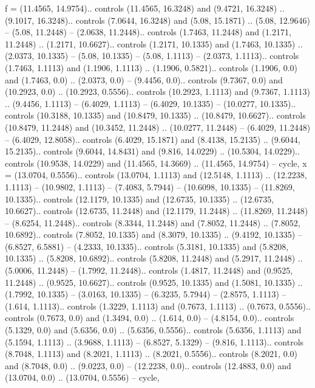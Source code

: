 {f} = {(11.4565, 14.9754).. controls (11.4565, 16.3248) and (9.4721, 16.3248) .. (9.1017, 16.3248).. controls (7.0644, 16.3248) and (5.08, 15.1871) .. (5.08, 12.9646) -- (5.08, 11.2448) -- (2.0638, 11.2448).. controls (1.7463, 11.2448) and (1.2171, 11.2448) .. (1.2171, 10.6627).. controls (1.2171, 10.1335) and (1.7463, 10.1335) .. (2.0373, 10.1335) -- (5.08, 10.1335) -- (5.08, 1.1113) -- (2.0373, 1.1113).. controls (1.7463, 1.1113) and (1.1906, 1.1113) .. (1.1906, 0.5821).. controls (1.1906, 0.0) and (1.7463, 0.0) .. (2.0373, 0.0) -- (9.4456, 0.0).. controls (9.7367, 0.0) and (10.2923, 0.0) .. (10.2923, 0.5556).. controls (10.2923, 1.1113) and (9.7367, 1.1113) .. (9.4456, 1.1113) -- (6.4029, 1.1113) -- (6.4029, 10.1335) -- (10.0277, 10.1335).. controls (10.3188, 10.1335) and (10.8479, 10.1335) .. (10.8479, 10.6627).. controls (10.8479, 11.2448) and (10.3452, 11.2448) .. (10.0277, 11.2448) -- (6.4029, 11.2448) -- (6.4029, 12.8058).. controls (6.4029, 15.1871) and (8.4138, 15.2135) .. (9.6044, 15.2135).. controls (9.6044, 14.8431) and (9.816, 14.0229) .. (10.5304, 14.0229).. controls (10.9538, 14.0229) and (11.4565, 14.3669) .. (11.4565, 14.9754) -- cycle},
{x} = {(13.0704, 0.5556).. controls (13.0704, 1.1113) and (12.5148, 1.1113) .. (12.2238, 1.1113) -- (10.9802, 1.1113) -- (7.4083, 5.7944) -- (10.6098, 10.1335) -- (11.8269, 10.1335).. controls (12.1179, 10.1335) and (12.6735, 10.1335) .. (12.6735, 10.6627).. controls (12.6735, 11.2448) and (12.1179, 11.2448) .. (11.8269, 11.2448) -- (8.6254, 11.2448).. controls (8.3344, 11.2448) and (7.8052, 11.2448) .. (7.8052, 10.6892).. controls (7.8052, 10.1335) and (8.3079, 10.1335) .. (9.4192, 10.1335) -- (6.8527, 6.5881) -- (4.2333, 10.1335).. controls (5.3181, 10.1335) and (5.8208, 10.1335) .. (5.8208, 10.6892).. controls (5.8208, 11.2448) and (5.2917, 11.2448) .. (5.0006, 11.2448) -- (1.7992, 11.2448).. controls (1.4817, 11.2448) and (0.9525, 11.2448) .. (0.9525, 10.6627).. controls (0.9525, 10.1335) and (1.5081, 10.1335) .. (1.7992, 10.1335) -- (3.0163, 10.1335) -- (6.3235, 5.7944) -- (2.8575, 1.1113) -- (1.614, 1.1113).. controls (1.3229, 1.1113) and (0.7673, 1.1113) .. (0.7673, 0.5556).. controls (0.7673, 0.0) and (1.3494, 0.0) .. (1.614, 0.0) -- (4.8154, 0.0).. controls (5.1329, 0.0) and (5.6356, 0.0) .. (5.6356, 0.5556).. controls (5.6356, 1.1113) and (5.1594, 1.1113) .. (3.9688, 1.1113) -- (6.8527, 5.1329) -- (9.816, 1.1113).. controls (8.7048, 1.1113) and (8.2021, 1.1113) .. (8.2021, 0.5556).. controls (8.2021, 0.0) and (8.7048, 0.0) .. (9.0223, 0.0) -- (12.2238, 0.0).. controls (12.4883, 0.0) and (13.0704, 0.0) .. (13.0704, 0.5556) -- cycle},
